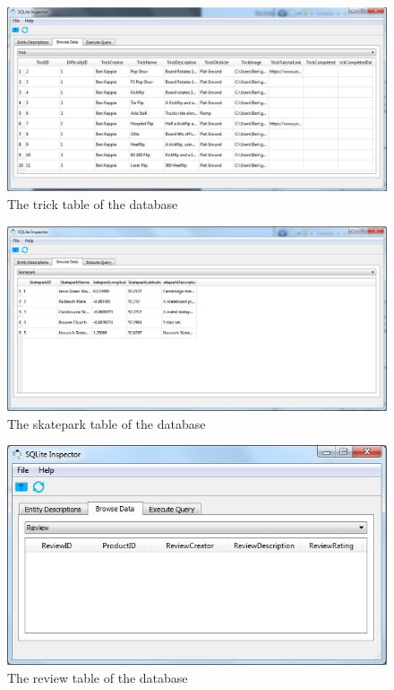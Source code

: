 \begin{figure}[H]
    \includegraphics[width=\textwidth]{./Maintenance/Figures/TrickTable.jpg}
    \caption{The trick table of the database} \label{fig:Trick Table}
\end{figure}


\begin{figure}[H]
    \includegraphics[width=\textwidth]{./Maintenance/Figures/SkateparkTable.jpg}
    \caption{The skatepark table of the database} \label{fig:Skatepark Table}
\end{figure}

\begin{figure}[H]
    \includegraphics[width=\textwidth]{./Maintenance/Figures/ReviewTable.jpg}
    \caption{The review table of the database} \label{fig:Review Table}
\end{figure}

